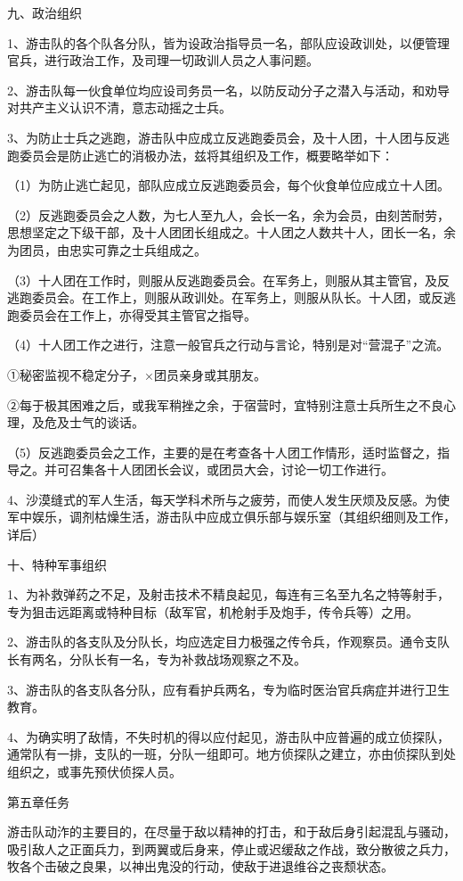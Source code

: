 九、政治组织

1、游击队的各个队各分队，皆为设政治指导员一名，部队应设政训处，以便管理官兵，进行政治工作，及司理一切政训人员之人事问题。

2、游击队每一伙食单位均应设司务员一名，以防反动分子之潜入与活动，和劝导对共产主义认识不清，意志动摇之士兵。

3、为防止士兵之逃跑，游击队中应成立反逃跑委员会，及十人团，十人团与反逃跑委员会是防止逃亡的消极办法，兹将其组织及工作，概要略举如下：

（1）为防止逃亡起见，部队应成立反逃跑委员会，每个伙食单位应成立十人团。

（2）反逃跑委员会之人数，为七人至九人，会长一名，余为会员，由刻苦耐劳，思想坚定之下级干部，及十人团团长组成之。十人团之人数共十人，团长一名，余为团员，由忠实可靠之士兵组成之。

（3）十人团在工作时，则服从反逃跑委员会。在军务上，则服从其主管官，及反逃跑委员会。在工作上，则服从政训处。在军务上，则服从队长。十人团，或反逃跑委员会在工作上，亦得受其主管官之指导。

（4）十人团工作之进行，注意一般官兵之行动与言论，特别是对“营混子”之流。

①秘密监视不稳定分子，×团员亲身或其朋友。

②每于极其困难之后，或我军稍挫之余，于宿营时，宜特别注意士兵所生之不良心理，及危及士气的谈话。

（5）反逃跑委员会之工作，主要的是在考查各十人团工作情形，适时监督之，指导之。并可召集各十人团团长会议，或团员大会，讨论一切工作进行。

4、沙漠缝式的军人生活，每天学科术所与之疲劳，而使人发生厌烦及反感。为使军中娱乐，调剂枯燥生活，游击队中应成立俱乐部与娱乐室（其组织细则及工作，详后）

十、特种军事组织

1、为补救弹药之不足，及射击技术不精良起见，每连有三名至九名之特等射手，专为狙击远距离或特种目标（敌军官，机枪射手及炮手，传令兵等）之用。

2、游击队的各支队及分队长，均应选定目力极强之传令兵，作观察员。通令支队长有两名，分队长有一名，专为补救战场观察之不及。

3、游击队的各支队各分队，应有看护兵两名，专为临时医治官兵病症并进行卫生教育。

4、为确实明了敌情，不失时机的得以应付起见，游击队中应普遍的成立侦探队，通常队有一排，支队的一班，分队一组即可。地方侦探队之建立，亦由侦探队到处组织之，或事先预伏侦探人员。

第五章任务

游击队动泎的主要目的，在尽量于敌以精神的打击，和于敌后身引起混乱与骚动，吸引敌人之正面兵力，到两翼或后身来，停止或迟缓敌之作战，致分散彼之兵力，牧各个击破之良果，以神出鬼没的行动，使敌于进退维谷之丧颓状态。

